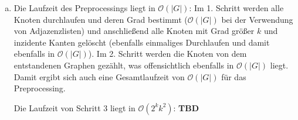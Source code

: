 \documentclass[12pt,a4paper]{article}
\begin{document}
\begin{enumerate}[a)]
	\item Die Laufzeit des Preprocessings liegt in \(\mathcal{O}(|G|)\): Im 1. Schritt werden alle Knoten durchlaufen und deren Grad bestimmt (\(\mathcal{O}(|G|)\) bei der Verwendung von Adjazenzlisten) und anschließend alle Knoten mit Grad größer \(k\) und inzidente Kanten gelöscht (ebenfalls einmaliges Durchlaufen und damit ebenfalls in \(\mathcal{O}(|G|)\)). Im 2. Schritt werden die Knoten von dem entstandenen Graphen gezählt, was offensichtlich ebenfalls in \(\mathcal{O}(|G|)\) liegt. Damit ergibt sich auch eine Gesamtlaufzeit von \(\mathcal{O}(|G|)\) für das Preprocessing.

	Die Laufzeit von Schritt 3 liegt in \(\mathcal{O}(2^k k^2)\): \textbf{TBD}

\end{enumerate}
\end{document}

